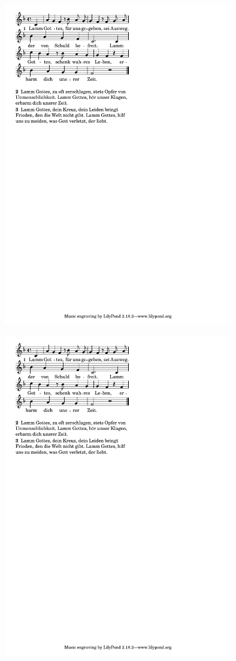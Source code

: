 \begin{center}
\vspace{-0.5em}
\includegraphics[width=0.75\textwidth, clip, trim=10 633 250 19]{noten/05_AgnusDei.pdf}

\includegraphics[width=0.75\textwidth, clip, trim=10 530 250 222]{noten/05_AgnusDei.pdf}

~\vfill\vspace{-1cm}

\footer
\end{center}